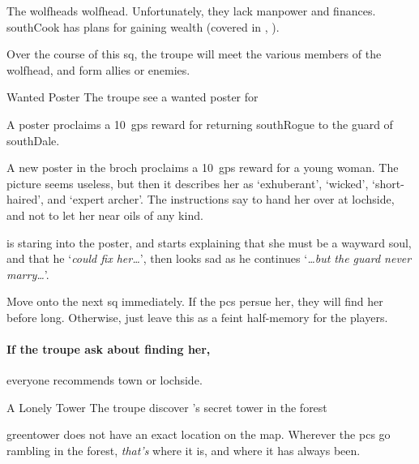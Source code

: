 \label{wolfHeads}

\noindent
The \glspl{wolfhead} \glsdesc{wolfhead}.
Unfortunately, they lack manpower and finances.
\Gls{southCook} has plans for gaining wealth (covered in , ).

Over the course of this \gls{sq}, the troupe will meet the various members of the \gls{wolfhead}, and form allies or enemies.

{\squash Wanted Poster}%
{The troupe see a wanted poster for }%

A poster proclaims a 10~\glspl{gp} reward for returning \gls{southRogue} to the \gls{guard} of \gls{southDale}.

\begin{boxtext}
  A new poster in the \gls{broch} proclaims a 10~\glspl{gp} reward for a young woman.
  The picture seems useless, but then it describes her as `exhuberant', `wicked', `short-haired', and `expert archer'.
  The instructions say to hand her over at \gls{lochside}, and not to let her near oils of any kind.

   is staring into the poster, and starts explaining that she must be a wayward soul, and that he `\textit{could fix her\ldots}', then looks sad as he continues `\textit{\ldots but the \gls{guard} never marry\ldots}'.
\end{boxtext}

Move onto the next \gls{sq} immediately.
If the \glspl{pc} persue her, they will find her before long.
Otherwise, just leave this as a feint half-memory for the players.

\paragraph{If the troupe ask about finding her,}
everyone recommends \gls{town} or \gls{lochside}.

{A Lonely Tower}%
{The troupe discover 's secret tower in the forest}%

\label{green_tower_sq}


\Gls{greentower} does not have an exact location on the map.
Wherever the \glspl{pc} go \gls{rambling} in the forest, \textit{that's} where it is, and where it has always been.

